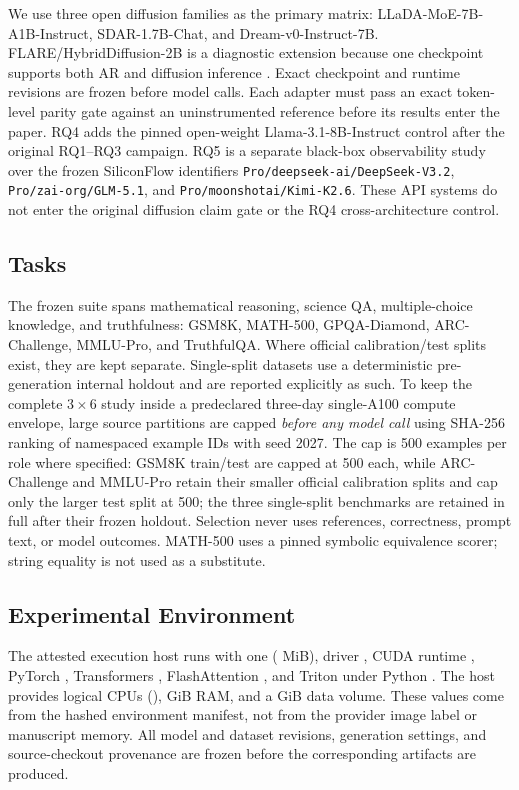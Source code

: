 \documentclass[10pt]{article}
\begin{document}
We use three open diffusion families as the primary matrix:
LLaDA-MoE-7B-A1B-Instruct, SDAR-1.7B-Chat, and Dream-v0-Instruct-7B.
FLARE/HybridDiffusion-2B is a diagnostic extension because one checkpoint supports both AR and diffusion inference \citep{zhu2026flare}.
Exact checkpoint and runtime revisions are frozen before model calls.
Each adapter must pass an exact token-level parity gate against an uninstrumented reference before its results enter the paper.
RQ4 adds the pinned open-weight Llama-3.1-8B-Instruct control after the original
RQ1--RQ3 campaign. RQ5 is a separate black-box observability study over the
frozen SiliconFlow identifiers \texttt{Pro/deepseek-ai/DeepSeek-V3.2},
\texttt{Pro/zai-org/GLM-5.1}, and
\texttt{Pro/moonshotai/Kimi-K2.6}. These API systems do not enter the original
diffusion claim gate or the RQ4 cross-architecture control.

\subsection{Tasks}

The frozen suite spans mathematical reasoning, science QA, multiple-choice knowledge, and truthfulness:
GSM8K, MATH-500, GPQA-Diamond, ARC-Challenge, MMLU-Pro, and TruthfulQA.
Where official calibration/test splits exist, they are kept separate.
Single-split datasets use a deterministic pre-generation internal holdout and are reported explicitly as such.
To keep the complete $3\times6$ study inside a predeclared three-day single-A100
compute envelope, large source partitions are capped \emph{before any model
call} using SHA-256 ranking of namespaced example IDs with seed 2027.
The cap is 500 examples per role where specified: GSM8K train/test are capped
at 500 each, while ARC-Challenge and MMLU-Pro retain their smaller official
calibration splits and cap only the larger test split at 500; the three
single-split benchmarks are retained in full after their frozen holdout.
Selection never uses references, correctness, prompt text, or model outcomes.
MATH-500 uses a pinned symbolic equivalence scorer; string equality is not used as a substitute.

\subsection{Experimental Environment}

The attested execution host runs \ComputeOS{} with one \ComputeGPUName{}
(\ComputeGPUMemoryMiB{} MiB), driver \ComputeDriverVersion{}, CUDA runtime
\ComputeCUDARuntime{}, PyTorch \ComputeTorchVersion{}, Transformers
\ComputeTransformersVersion{}, FlashAttention
\ComputeFlashAttentionVersion{}, and Triton \ComputeTritonVersion{} under
Python \ComputePythonVersion{}. The host provides \ComputeLogicalCPUs{}
logical CPUs (\ComputeCPUModel{}), \ComputeRAMGiB{} GiB RAM, and a
\ComputeDataDiskGiB{} GiB data volume. These values come from the hashed
environment manifest, not from the provider image label or manuscript memory.
All model and dataset revisions, generation settings, and source-checkout
provenance are frozen before the corresponding artifacts are produced.
\end{document}
